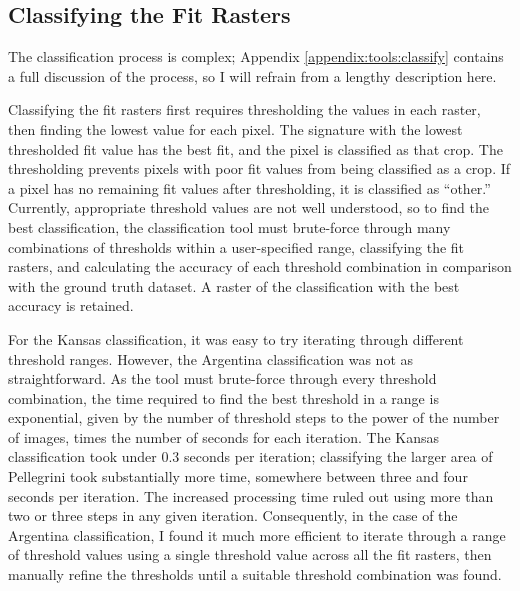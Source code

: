 \subsection{Classifying the Fit Rasters}

The classification process is complex; Appendix \ref{appendix:tools:classify} contains a full discussion of the process, so I will refrain from a lengthy description here.

Classifying the fit rasters first requires thresholding the values in each raster, then finding the lowest value for each pixel. The signature with the lowest thresholded fit value has the best fit, and the pixel is classified as that crop. The thresholding prevents pixels with poor fit values from being classified as a crop. If a pixel has no remaining fit values after thresholding, it is classified as ``other.'' Currently, appropriate threshold values are not well understood, so to find the best classification, the classification tool must brute-force through many combinations of thresholds within a user-specified range, classifying the fit rasters, and calculating the accuracy of each threshold combination in comparison with the ground truth dataset. A raster of the classification with the best accuracy is retained.

For the Kansas classification, it was easy to try iterating through different threshold ranges. However, the Argentina classification was not as straightforward. As the tool must brute-force through every threshold combination, the time required to find the best threshold in a range is exponential, given by the number of threshold steps to the power of the number of images, times the number of seconds for each iteration. The Kansas classification took under 0.3 seconds per iteration; classifying the larger area of Pellegrini took substantially more time, somewhere between three and four seconds per iteration. The increased processing time ruled out using more than two or three steps in any given iteration. Consequently, in the case of the Argentina classification, I found it much more efficient to iterate through a range of threshold values using a single threshold value across all the fit rasters, then manually refine the thresholds until a suitable threshold combination was found.